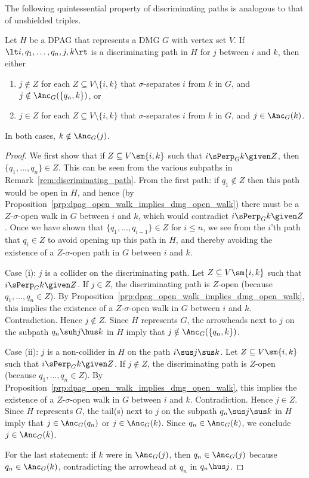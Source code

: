 The following quintessential property of discriminating paths is analogous to that of unshielded triples. 
\begin{Prp}\label{prp:orienting_discriminating_paths}
  Let $H$ be a DPAG that represents a DMG $G$ with vertex set $V$.
  If $\lt i, q_1, \dots, q_n, j, k \rt$ is a discriminating path in $H$ for $j$ between $i$ and $k$, then
  either 
  \begin{enumerate}[label=(\roman*)]
    \item $j \notin Z$ for each $Z \subseteq V \setminus \{i,k\}$ that $\sigma$-separates $i$ from $k$ in $G$, and $j \notin \Anc_G(\{q_n,k\})$, or
    \item $j \in Z$ for each $Z \subseteq V \setminus \{i,k\}$ that $\sigma$-separates $i$ from $k$ in $G$, and $j \in \Anc_G(k)$.
  \end{enumerate}
  In both cases, $k \notin \Anc_G(j)$.
\end{Prp}
\begin{proof}
  We first show that if $Z \subseteq V \sm \{i,k\}$ such that $i \sPerp_G k \given Z$, then $\{q_1, \dots, q_n\} \in Z$.
  This can be seen from the various subpaths in Remark~\ref{rem:discriminating_path}.
  From the first path: if $q_1 \notin Z$ then this path would be open in $H$, and hence (by Proposition~\ref{prp:dpag_open_walk_implies_dmg_open_walk}) there must be a $Z$-$\sigma$-open walk in $G$ between $i$ and $k$, which would contradict $i \sPerp_G k \given Z$.
  Once we have shown that $\{q_1, \dots, q_{i-1}\} \in Z$ for $i \le n$, we see from the $i$'th path that $q_i \in Z$ to avoid opening up this path in $H$, and thereby avoiding the existence of a $Z$-$\sigma$-open path in $G$ between $i$ and $k$.

  Case (i): $j$ is a collider on the discriminating path.
  Let $Z \subseteq V \sm \{i,k\}$ such that $i \sPerp_G k \given Z$. 
  If $j \in Z$, the discriminating path is $Z$-open (because $q_1,\dots,q_n \in Z$).
  By Proposition~\ref{prp:dpag_open_walk_implies_dmg_open_walk}, this implies the existence of a $Z$-$\sigma$-open walk in $G$ between $i$ and $k$.
  Contradiction. 
  Hence $j \notin Z$.
  Since $H$ represents $G$, the arrowheads next to $j$ on the subpath $q_n \suh j \hus k$ in $H$ imply that $j \notin \Anc_G(\{q_n,k\})$.

  Case (ii): $j$ is a non-collider in $H$ on the path $i \sus j \sus k$.
  Let $Z \subseteq V \sm \{i,k\}$ such that $i \sPerp_G k \given Z$. 
  If $j \notin Z$, the discriminating path is $Z$-open (because $q_1,\dots,q_n \in Z$).
  By Proposition~\ref{prp:dpag_open_walk_implies_dmg_open_walk}, this implies the existence of a $Z$-$\sigma$-open walk in $G$ between $i$ and $k$.
  Contradiction. 
  Hence $j \in Z$.
  Since $H$ represents $G$, the tail(s) next to $j$ on the subpath $q_n \sus j \sus k$ in $H$ imply that $j \in \Anc_G(q_n)$ or $j \in \Anc_G(k)$.
  Since $q_n \in \Anc_G(k)$, we conclude $j \in \Anc_G(k)$.

  For the last statement: if $k$ were in $\Anc_G(j)$, then $q_n \in \Anc_G(j)$ because $q_n \in \Anc_G(k)$, contradicting the arrowhead at $q_n$ in $q_n \hus j$.
\end{proof}
